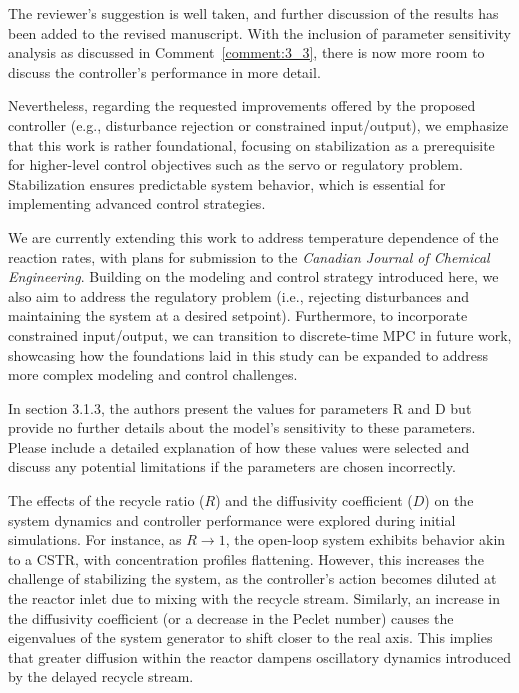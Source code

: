 \documentclass[11pt,answers]{exam}
\begin{document}
\begin{questions}
    \begin{solutionorbox} \label{comment:3_2}
        The reviewer's suggestion is well taken, and further discussion of the results has been added to the revised manuscript. With the inclusion of parameter sensitivity analysis as discussed in Comment~\ref{comment:3_3}, there is now more room to discuss the controller’s performance in more detail.

        Nevertheless, regarding the requested improvements offered by the proposed controller (e.g., disturbance rejection or constrained input/output), we emphasize that this work is rather foundational, focusing on stabilization as a prerequisite for higher-level control objectives such as the servo or regulatory problem. Stabilization ensures predictable system behavior, which is essential for implementing advanced control strategies.
        
        We are currently extending this work to address temperature dependence of the reaction rates, with plans for submission to the \textit{Canadian Journal of Chemical Engineering}. Building on the modeling and control strategy introduced here, we also aim to address the regulatory problem (i.e., rejecting disturbances and maintaining the system at a desired setpoint). Furthermore, to incorporate constrained input/output, we can transition to discrete-time MPC in future work, showcasing how the foundations laid in this study can be expanded to address more complex modeling and control challenges.
    \end{solutionorbox}


    \question In section 3.1.3, the authors present the values for parameters R and D but provide no further details about the model's sensitivity to these parameters. Please include a detailed explanation of how these values were selected and discuss any potential limitations if the parameters are chosen incorrectly.

    \begin{solutionorbox} \label{comment:3_3}
        The effects of the recycle ratio (\(R\)) and the diffusivity coefficient (\(D\)) on the system dynamics and controller performance were explored during initial simulations. For instance, as \(R \to 1\), the open-loop system exhibits behavior akin to a CSTR, with concentration profiles flattening. However, this increases the challenge of stabilizing the system, as the controller's action becomes diluted at the reactor inlet due to mixing with the recycle stream. Similarly, an increase in the diffusivity coefficient (or a decrease in the Peclet number) causes the eigenvalues of the system generator to shift closer to the real axis. This implies that greater diffusion within the reactor dampens oscillatory dynamics introduced by the delayed recycle stream.


\end{solutionorbox}
\end{questions}
\end{document}
